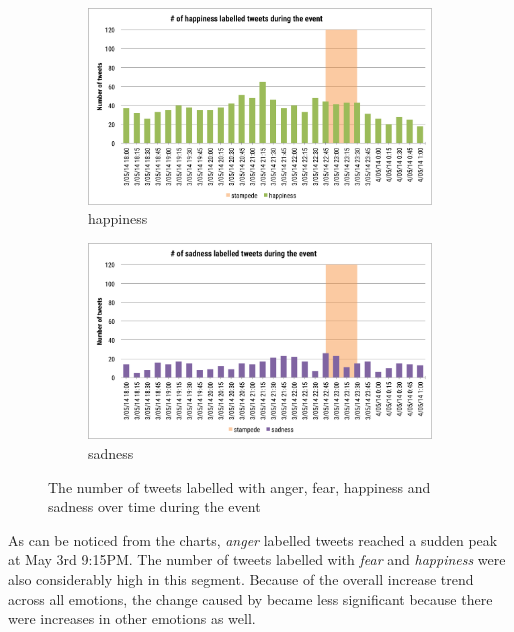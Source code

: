 \begin{figure}[htb!]
\begin{subfigure}{0.5\textwidth}
\centering    
\includegraphics[width=0.99\linewidth]{HappinessInstanceEvent}
\caption{happiness}
\label{fig:happinessInstanceEvent}
\end{subfigure}%
\begin{subfigure}{0.5\textwidth}
\centering    
\includegraphics[width=0.99\linewidth]{SadnessInstanceEvent}
\caption{sadness}
\label{fig:sadnessInstanceEvent}
\end{subfigure}
\caption{The number of tweets labelled with anger, fear, happiness and sadness over time during the event}
\label{fig:instanceEvent}
\end{figure}

As can be noticed from the charts, \textit{anger} labelled tweets reached a sudden peak at May 3rd 9:15PM. The number of tweets labelled with \textit{fear} and \textit{happiness} were also considerably high in this segment. Because of the overall increase trend across all emotions, the change caused by  became less significant because there were increases in other emotions as well.

